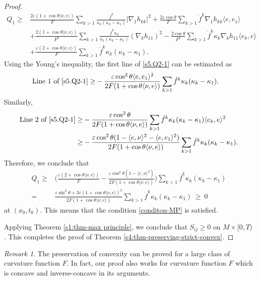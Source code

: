 \documentclass[11pt,reqno]{amsart}
\theoremstyle{definition}
\theoremstyle{remark}
\newtheorem{rem}{Remark}
\numberwithin{equation}{section}
\renewcommand{\(}{\left(}
\renewcommand{\)}{\right)}
\renewcommand{\-}{\overline}
\newcommand{\e}{\varepsilon}
\renewcommand{\t}{\theta}
\begin{document}
\begin{proof}
\begin{align}
    Q_1\geq &\frac{2\varepsilon(1+\cos\t\langle \nu,e\rangle)}{F} \sum_{k>1}\frac{\dot{f}^{k}}{\kappa_k(\kappa_{k}-\kappa_1)}|\nabla_1 h_{kk}|^2+\frac{2\varepsilon\cos\t}{F}\sum_{k>1}\dot{f}^k\nabla_1h_{kk} \langle e,e_1\rangle\nonumber\\
   &+\frac{2(1+\cos\t\langle \nu,e\rangle)}{F^2} \sum_{k>1}\frac{\dot{f}^k\kappa_k}{\kappa_1(\kappa_k-\kappa_1)}(\nabla_kh_{11})^2-\frac{2\cos\t}{F^2}\sum_{k>1}\dot{f}^{k}\kappa_k\nabla_kh_{11}\langle e_k,e\rangle \nonumber\\
    &+\frac{\e(2+\cos\t\langle \nu,e\rangle)}{F}\sum_{k>1}\dot{f}^k\kappa_k(\kappa_k-\kappa_1).
    \end{align}
   Using the Young's inequality, the first line of \eqref{s5.Q2-1} can be estimated as
    \begin{align*}
     \text{Line 1 of }\eqref{s5.Q2-1} \geq  & -\frac{\varepsilon\cos^2\theta\langle e,e_1\rangle^2 }{2F(1+\cos\t\langle \nu,e\rangle)}\sum_{k>1}\dot{f}^k\kappa_k(\kappa_k-\kappa_1).
    \end{align*}
    Similarly,
     \begin{align*}
     \text{Line 2 of }\eqref{s5.Q2-1}\geq  & -\frac{\varepsilon\cos^2\theta}{2F(1+\cos\t\langle \nu,e\rangle)}\sum_{k>1}\dot{f}^k\kappa_k(\kappa_k-\kappa_1)\langle e_k,e\rangle^2\\
     \geq &-\frac{\varepsilon\cos^2\theta(1-\langle e,\nu\rangle^2-\langle e,e_1\rangle^2)}{2F(1+\cos\t\langle \nu,e\rangle)}\sum_{k>1}\dot{f}^k\kappa_k(\kappa_k-\kappa_1).
    \end{align*}
    Therefore, we conclude that
     \begin{align*}%
    Q_1\geq &\biggl(\frac{\e(2+\cos\t\langle \nu,e\rangle)}{F}-\frac{\varepsilon\cos^2\theta(1-\langle e,\nu\rangle^2)}{2F(1+\cos\t\langle \nu,e\rangle)}\biggr)\sum_{k>1}\dot{f}^k\kappa_k(\kappa_k-\kappa_1)\nonumber\\
 =  & \frac{\varepsilon\sin^2\theta+3\varepsilon(1+\cos\theta\langle\nu,e\rangle)^2}{2F(1+\cos\t\langle \nu,e\rangle)}\sum_{k>1}\dot{f}^k\kappa_k(\kappa_k-\kappa_1)~\geq~0
    \end{align*}
at $(x_0,t_0)$.   This means that the condition \eqref{conditon-MP} is satisfied.

Applying Theorem \ref{s1:thm-max principle}, we conclude that $S_{ij}\geq 0$ on $M\times [0,T)$. This completes the proof of Theorem \ref{s4:thm-preserving-strict-convex}.
\end{proof}
\begin{rem}
The preservation of convexity can be proved for a large class of curvature function $F$. In fact, our proof also works for curvature function $F$ which is concave and inverse-concave in its arguments.
\end{rem}
\end{document}
